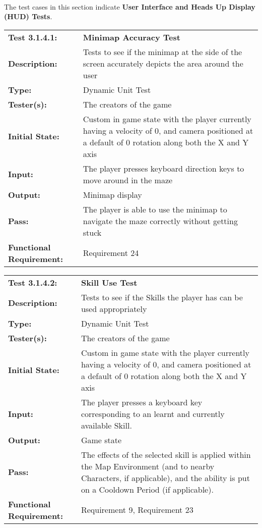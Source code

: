 \documentclass[12pt, titlepage]{article}
\begin{document}
\paragraph{}The test cases in this section indicate \textbf{User Interface and Heads Up Display (HUD) Tests}.
\begin{mdframed}[linewidth=1pt]
\begin{tabularx}{\textwidth}{@{}p{3cm}X@{}}
{\bf Test 3.1.4.1:} & {\bf Minimap Accuracy Test}\\[\baselineskip]
{\bf Description:} & Tests to see if the minimap at the side of the screen accurately depicts the area around the user\\[0.5\baselineskip]
{\bf Type:} & Dynamic Unit Test\\[0.5\baselineskip]
{\bf Tester(s):} & The creators of the game\\[0.5\baselineskip]
{\bf Initial State:} & Custom in game state with the player currently having a velocity of 0, and camera positioned at a default of 0 rotation along both the X and Y axis\\[0.5\baselineskip]
{\bf Input:} & The player presses keyboard direction keys to move around in the maze\\[0.5\baselineskip]
{\bf Output:} & Minimap display\\[0.5\baselineskip]
{\bf Pass:} & The player is able to use the minimap to navigate the maze correctly without getting stuck \\[0.5\baselineskip]
{\bf Functional Requirement:} & Requirement 24
\end{tabularx}
\end{mdframed}

\begin{mdframed}[linewidth=1pt]
\begin{tabularx}{\textwidth}{@{}p{3cm}X@{}}
{\bf Test 3.1.4.2:} & {\bf Skill Use Test}\\[\baselineskip]
{\bf Description:} & Tests to see if the Skills the player has can be used appropriately \\[0.5\baselineskip]
{\bf Type:} & Dynamic Unit Test\\[0.5\baselineskip]
{\bf Tester(s):} & The creators of the game\\[0.5\baselineskip]
{\bf Initial State:} & Custom in game state with the player currently having a velocity of 0, and camera positioned at a default of 0 rotation along both the X and Y axis\\[0.5\baselineskip]
{\bf Input:} & The player presses a keyboard key corresponding to an learnt and currently available Skill. \\[0.5\baselineskip]
{\bf Output:} & Game state\\[0.5\baselineskip]
{\bf Pass:} & The effects of the selected skill is applied within the Map Environment (and to nearby Characters, if applicable), and the ability is put on a Cooldown Period (if applicable). \\[0.5\baselineskip]
{\bf Functional Requirement:} & Requirement 9, Requirement 23
\end{tabularx}
\end{mdframed}
\end{document}
